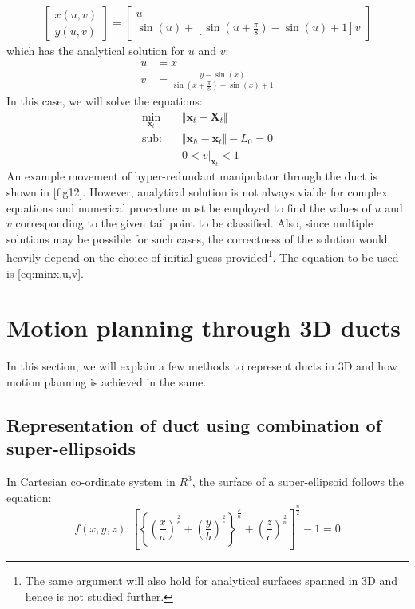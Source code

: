 \documentclass[12pt,a4]{article}
\begin{document}
\begin{align}
\begin{bmatrix}
x(u,v)\\y(u,v)
\end{bmatrix} = 
\begin{bmatrix}
u\\\sin\left(u\right)+\left[\sin\left(u+\frac{\pi}{8}\right)-\sin\left(u\right)+1 \right]v
\end{bmatrix}
\end{align}
which has the analytical solution for $u$ and $v$:
\begin{align*}
u &= x\\
v &= \frac{y-\sin\left(x\right)}{\sin\left(x+\frac{\pi}{8}\right)-\sin\left(x\right)+1}
\end{align*}
In this case, we will solve the equations:
\begin{align}
\label{eq:analy2D}
\min_{\textbf{x}_t} &\Vert \textbf{x}_t-\textbf{X}_t \Vert\\
\nonumber \text{sub:~~~} &\Vert \textbf{x}_h - \textbf{x}_t \Vert -L_0 = 0\\
&0< v\vert_{\mathbf{x}_t}< 1
\end{align} 
 An example movement of hyper-redundant manipulator through the duct is shown in [fig12]. However, analytical solution is not always viable for complex equations and numerical procedure must be employed to find the values of $u$ and $v$ corresponding to the given tail point to be classified. Also, since multiple solutions may be possible for such cases, the correctness of the solution would heavily depend on the choice of initial guess provided\footnote{The same argument will also hold for analytical surfaces spanned in 3D and hence is not studied further.}. The equation to be used is \ref{eq:minx,u,v}.

\section{Motion planning through 3D ducts}
In this section, we will explain a few methods to represent ducts in 3D and how motion planning is achieved in the same.
\subsection{Representation of duct using combination of super-ellipsoids}
In Cartesian co-ordinate system in $R^3$, the surface of a super-ellipsoid follows the equation:
\begin{equation}
f(x,y,z) : \left[ \left\lbrace \left(\frac{x}{a} \right)^{\frac 2e} +\left(\frac{y}{b} \right)^{\frac 2e} \right\rbrace^{\frac{e}{n}} +\left(\frac{z}{c} \right)^{\frac 2n}  \right]^\frac n2-1 =0
\end{equation}
\end{document}
